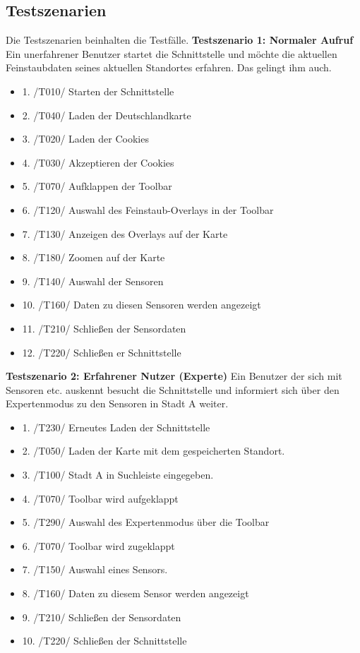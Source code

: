 \subsection{Testszenarien}
Die Testszenarien beinhalten die Testfälle. 
\textbf{Testszenario 1: Normaler Aufruf}
\newline
Ein unerfahrener Benutzer startet die Schnittstelle und möchte die aktuellen Feinstaubdaten seines aktuellen Standortes erfahren. Das gelingt ihm auch.
\begin{itemize} [noitemsep]
    \item 1. /T010/ Starten der Schnittstelle
    \item 2. /T040/ Laden der Deutschlandkarte
    \item 3. /T020/ Laden der Cookies
    \item 4. /T030/ Akzeptieren der Cookies
    \item 5. /T070/ Aufklappen der Toolbar
    \item 6. /T120/ Auswahl des Feinstaub-Overlays in der Toolbar
    \item 7. /T130/ Anzeigen des Overlays auf der Karte
    \item 8. /T180/ Zoomen auf der Karte
    \item 9. /T140/ Auswahl der Sensoren
    \item 10. /T160/ Daten zu diesen Sensoren werden angezeigt
    \item 11. /T210/ Schließen der Sensordaten
    \item 12. /T220/ Schließen er Schnittstelle
\end{itemize}

\textbf{Testszenario 2: Erfahrener Nutzer (Experte)}
\newline
Ein Benutzer der sich mit Sensoren etc. auskennt besucht die Schnittstelle und informiert sich über den Expertenmodus zu den Sensoren in Stadt A weiter.
\begin{itemize} [noitemsep]
    \item 1. /T230/ Erneutes Laden der Schnittstelle
    \item 2. /T050/ Laden der Karte mit dem gespeicherten Standort.
    \item 3. /T100/ Stadt A in Suchleiste eingegeben.
    \item 4. /T070/ Toolbar wird aufgeklappt
    \item 5. /T290/ Auswahl des Expertenmodus über die Toolbar
    \item 6. /T070/ Toolbar wird zugeklappt
    \item 7. /T150/ Auswahl eines Sensors.
    \item 8. /T160/ Daten zu diesem Sensor werden angezeigt
    \item 9. /T210/ Schließen der Sensordaten
    \item 10. /T220/ Schließen der Schnittstelle
\end{itemize}

